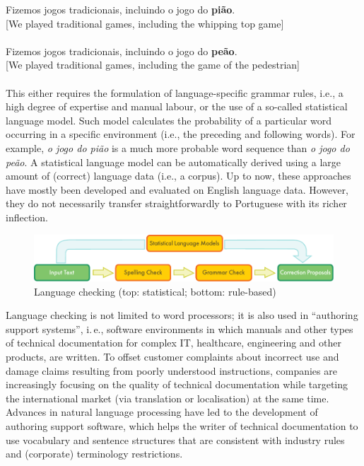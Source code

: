 \begin{multicols}{2}
Fizemos jogos tradicionais, incluindo o jogo do \textbf{pião}.\\
{[}We played traditional games, including the whipping top game{]}\\
\\
Fizemos jogos tradicionais, incluindo o jogo do \textbf{peão}.\\
{[}We played traditional games, including the game of the pedestrian{]}\\
\\
This either requires the formulation of language-specific grammar rules, i.e., a high degree of expertise and manual labour, or the use of a so-called statistical language model. Such model calculates the probability of a particular word occurring in a specific environment (i.e., the preceding and following words). For example, \textit{o jogo do pião} is a much more probable word sequence than \textit{o jogo do peão}. A statistical language model can be automatically derived using a large amount of (correct) language data (i.e., a corpus). Up to now, these approaches have mostly been developed and evaluated on English language data. However, they do not necessarily transfer straightforwardly to Portuguese with its richer inflection. 

\begin{figure}[htb]
  \center
  \includegraphics[width=\textwidth]{../_media/english/language_checking}
  \caption{Language checking (top: statistical; bottom: rule-based)}
  \label{fig:langcheckingaarch_en}
\end{figure}



Language checking is not limited to word processors; it is also used in “authoring support systems”, i.\,e., software environments in which manuals and other types of technical documentation for complex IT, healthcare, engineering and other products, are written. To offset customer complaints about incorrect use and damage claims resulting from poorly understood instructions, companies are increasingly focusing on the quality of technical documentation while targeting the international market (via translation or localisation) at the same time. Advances in natural language processing have led to the development of authoring support software, which helps the writer of technical documentation to use vocabulary and sentence structures that are consistent with industry rules and (corporate) terminology restrictions.


\end{multicols}
